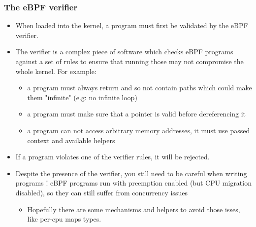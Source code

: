\begin{frame}[fragile]
  \frametitle{The eBPF verifier}
  \begin{itemize}
    \item When loaded into the kernel, a program must first be validated by the
    eBPF verifier.
    \item The verifier is a complex piece of software which checks eBPF
    programs against a set of rules to ensure that running those may not
    compromise the whole kernel. For example:
    \begin{itemize}
      \item a program must always return and so not contain paths which could
      make them "infinite" (e.g: no infinite loop)
      \item a program must make sure that a pointer is valid before
      dereferencing it
      \item a program can not access arbitrary memory addresses, it must use
      passed context and available helpers
    \end{itemize}
    \item If a program violates one of the verifier rules, it will be rejected.
    \item Despite the presence of the verifier, you still need to be careful when
    writing programs ! eBPF programs run with preemption enabled (but CPU
    migration disabled), so they can still suffer from concurrency issues
    \begin{itemize}
      \item Hopefully there are some mechanisms and helpers to avoid those isses,
      like per-cpu maps types.
    \end{itemize}
  \end{itemize}
\end{frame}

